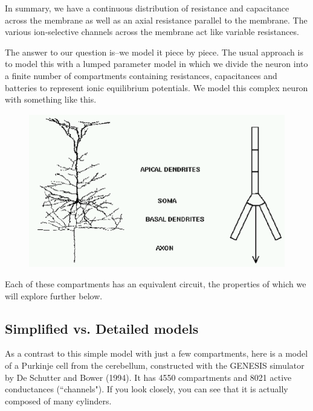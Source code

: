 \documentclass[12pt]{article}
\begin{document}
In summary, we have a continuous distribution of resistance and capacitance across the membrane as well as an axial resistance parallel to the membrane. The various ion-selective channels across the membrane act like variable resistances.

The answer to our question is--we model it piece by piece. The usual approach is to model this with a lumped parameter model in which we divide the neuron into a finite number of compartments containing resistances, capacitances and batteries to represent ionic equilibrium potentials. We model this complex neuron with something like this.

\begin{figure}[h]
  \centering
 \includegraphics[scale=0.5]{figures/compartments.eps}
  \label{fig:compartments}
\end{figure}

Each of these compartments has an equivalent circuit, the properties of which we will explore further below.

\subsection*{Simplified vs. Detailed models}

As a contrast to this simple model with just a few compartments, here is a model of a Purkinje cell from the cerebellum, constructed with the GENESIS simulator by De Schutter and Bower (1994). It has 4550 compartments and 8021 active conductances (``channels"). If you look closely, you can see that it is actually composed of many cylinders.
\end{document}
